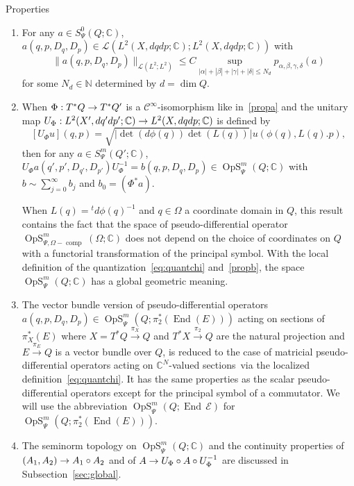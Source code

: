 \documentclass[AHL,Unicode,longabstracts]{cedram}
\newcommand{\C}{\mathbb{C}}
\newcommand{\N}{\mathbb{N}}
\newcommand{\clC}{\mathcal{C}}
\newcommand{\clE}{\mathcal{E}}
\newcommand{\clL}{\mathcal{L}}
\DeclareMathOperator{\End}{End}
\DeclareMathOperator{\OpS}{OpS}
\DeclareMathOperator{\ccomp}{comp}
\DeclareMathOperator{\Idd}{Id}
\renewcommand*{\to}{\mathchoice{\longrightarrow}{\rightarrow}{\rightarrow}{\rightarrow}}
\begin{document}
\begin{enonce*}[remark]{Properties}
\begin{enumerate}
In particular for any $a\in \OpS^{m}_{\Psi}(Q;\C)$ which is elliptic $(|a(q,p,\xi,\eta)|\geq C^{-1}(1+|\xi|^{2}+|p|^{4}+|\eta|^{4})^{m/2})$ there exists $b\sim \sum_{n=0}^{\infty}b_{j}$ with $b_{0}=\frac{1}{a_0}$ such that $b(q,p,D_{q},D_{p})\circ a(q,p,D_{q},D_{p})\sim a(q,p,D_{q},D_{p})\circ b(q,p,D_{q},D_{p})\sim\Idd$.
\item\label{propf} For any $a\in S^{0}_{\Psi}(Q;\C)$, $a(q,p,D_{q},D_{p})\in \clL(L^{2}(X,dqdp;\C); L^{2}(X,dqdp;\C))$ with
\[
\|a(q,p,D_{q},D_{p})\|_{\clL(L^{2};L^{2})}
\leq C\sup_{|\alpha|+|\beta|+|\gamma|+|\delta|\leq N_{d}}p_{\alpha,\beta,\gamma,\delta}(a)
\]
for some $N_{d}\in \N$ determined by $d=\dim Q$.
\item\label{propg} When $\Phi:T^{*}Q\to T^{*}Q'$ is a $\clC^{\infty}$-isomorphism like in~\eqref{propa} and the unitary map $U_{\Phi}:L^{2}(X',dq'dp';\C)\to L^{2}(X,dqdp;\C)$ is defined by
\[
[U_{\Phi}u](q,p)=\sqrt {\lvert\det(d\phi(q))\det(L(q))}|u(\phi(q),L(q).p),
\]
then for any $a\in S^{m}_{\Psi}(Q';\C)$, $U_{\Phi}a(q',p',D_{q'},D_{p'})U_{\Phi}^{-1}=b(q,p,D_{q},D_{p})\in \OpS^{m}_{\Psi}(Q;\C)$ with $b\sim\sum_{j=0}^{\infty}b_{j}$ and $b_{0}=(\Phi^{*}a)$.

When $L(q)={}^{t}d\phi(q)^{-1}$ and $q\in \Omega$ a coordinate domain in $Q$, this result contains the fact that the space of pseudo-differential operator $\OpS^{m}_{\Psi, \Omega-\ccomp}(\Omega;\C)$ does not depend on the choice of coordinates on $Q$ with a functorial transformation of the principal symbol. With the local definition of the quantization~\eqref{eq:quantchi} and~\eqref{propb}, the space $\OpS^{m}_{\Psi}(Q;\C)$ has a global geometric meaning.

\item\label{proph} The vector bundle version of pseudo-differential operators $a(q,p,D_{q},D_{p})\in \OpS^{m}_{\Psi}(Q;\pi_{2}^{*}(\End(E)))$ acting on sections of $\pi_{X}^{*}(E)$ where $X=T^{*}Q\xrightarrow{\pi_{X}} Q$ and $T^{*}X\xrightarrow{\pi_{2}} Q$ are the natural projection and $E\xrightarrow{\pi_{E}} Q$ is a vector bundle over $Q$, is reduced to the case of matricial pseudo-differential operators acting on $\C^{N}$-valued sections~via the localized definition~\eqref{eq:quantchi}. It has the same properties as the scalar pseudo-differential operators except for the principal symbol of a commutator. We will use the abbreviation $\OpS^{m}_{\Psi}(Q;\End\,\clE)$ for $\OpS^{m}_{\Psi}(Q;\pi_{2}^{*}(\End(E)))$.
\item\label{propi} The seminorm topology on $\OpS^{m}_{\Psi}(Q;\C)$ and the continuity properties of $(A_{1},A_{2})\to A_{1}\circ A_{2}$ and of $A\to U_{\Phi}\circ A \circ U_{\Phi}^{-1}$ are discussed in Subsection~\ref{sec:global}.
\end{enumerate}
\end{enonce*}
\end{document}
